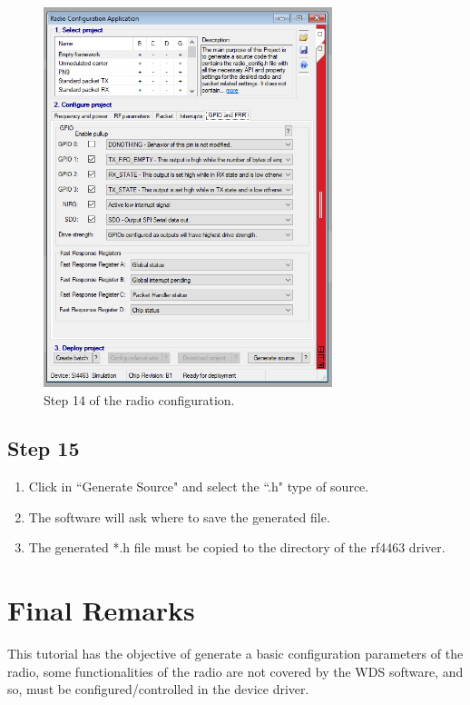 \documentclass[12pt]{book}
\begin{document}
\begin{appendices}
\begin{figure}[!h]
	\begin{center}
		\includegraphics[width=0.75\textwidth]{figures/wds-tutorial-14.png}
		\caption{Step 14 of the radio configuration.}
		\label{fig:wds-tutorial-step-14}
	\end{center}
\end{figure}

\subsection{Step 15}

\begin{enumerate}
    \item Click in ``Generate Source" and select the ``.h" type of source.
    \item The software will ask where to save the generated file.
    \item The generated *.h file must be copied to the directory of the rf4463 driver.
\end{enumerate}

\section{Final Remarks}

This tutorial has the objective of generate a basic configuration parameters of the radio, some functionalities of the radio are not covered by the WDS software, and so, must be configured/controlled in the device driver.


\end{appendices}
\end{document}
